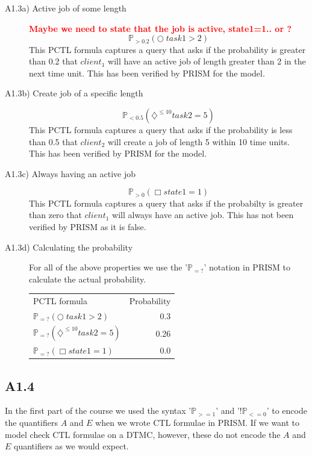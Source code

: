 \documentclass[12pt]{report}
\begin{document}
\begin{description}
\item[A1.3a) Active job of some length] {\huge\textbf{\textcolor{red}{Maybe we need to state that the job is active, state1=1.. or ?}}}
$$\mathbb{P}_{> 0.2}(\bigcirc \; task1 > 2)$$
This PCTL formula captures a query that asks if the probability is greater than 0.2 that $client_1$ will have an active job of length greater than 2 in the next time unit. This has been verified by PRISM for the model.


\item[A1.3b) Create job of a specific length]
$$\mathbb{P}_{< 0.5}(\diamondsuit^{\leq 10} task2=5)$$
This PCTL formula captures a query that asks if the probability is less than 0.5 that $client_2$ will create a job of length 5 within 10 time units. This has been verified by PRISM for the model.


\item[A1.3c) Always having an active job]
$$\mathbb{P}_{> 0}(\Box state1=1)$$
This PCTL formula captures a query that asks if the probabilty is greater than zero that $client_1$ will always have an active job. This has not been verified by PRISM as it is false.


\item[A1.3d) Calculating the probability]
For all of the above properties we use the '$\mathbb{P}_{=?}$' notation in PRISM to calculate the actual probability.
\begin{center}
\begin{tabular}{l r}
PCTL formula & Probability\\
$\mathbb{P}_{=?}(\bigcirc \; task1> 2)$ & 0.3\\
$\mathbb{P}_{=?}(\diamondsuit^{\leq10} task2=5)$ & 0.26\\
$\mathbb{P}_{=?}(\Box state1=1)$ & 0.0\\
\end{tabular}
\end{center}

\end{description}

\subsection*{A1.4}
In the first part of the course we used the syntax '$\mathbb{P}_{>=1}$' and '$!\mathbb{P}_{<=0}$' to encode the quantifiers $A$ and $E$ when we wrote CTL formulae in PRISM. If we want to model check CTL formulae on a DTMC, however, these do not encode the $A$ and $E$ quantifiers as we would expect.
\end{document}
